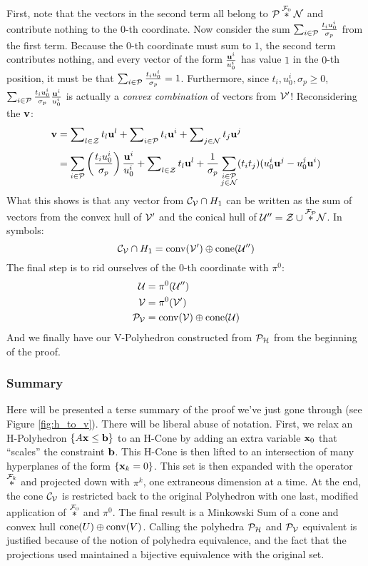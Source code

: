 First, note that the vectors in the second term all belong to $\P \fjoin{0} \N$ and contribute nothing to the $0$-th coordinate.  Now consider the sum $\sum_{i\in\P}\frac{t_i u^i_0}{\sigma_p}$ from the first term.  Because the $0$-th coordinate must sum to $1$, the second term contributes nothing, and every vector of the form $\frac{\u^i}{u^i_0}$ has value $1$ in the $0$-th position, it must be that $\sum_{i\in\P}\frac{t_i u^i_0}{\sigma_p} = 1$.  Furthermore, since $t_i, u^i_0, \sigma_p \geq 0$, $\sum_{i\in\P}\frac{t_i u^i_0}{\sigma_p} \frac{\u^i}{u^i_0}$ is actually a \textit{convex combination} of vectors from $\V'$!  Reconsidering the $\v$:
  \begin{align*}
  \v &= \setsum{t}{l}{\Z} +
        \setsum{t}{i}{\P} +
        \setsum{t}{j}{\N} \\[3pt]
     &= \sum_{i\in\P}\left(\frac{t_i u^i_0}{\sigma_p}\right) \frac{\u^i}{u^i_0} + 
        \setsum{t}{l}{\Z} +
        \frac{1}{\sigma_p}\sum_{\substack{i\in\P\\j\in\N}} (t_i t_j) (u^i_0\u^j - u^j_0\u^i)
  \end{align*}
What this shows is that any vector from $\CV \cap H_1$ can be written as the sum of vectors from the convex hull of $\V'$ and the conical hull of $\U'' = \Z \cup \fjoin{\P}{\N}$.  In symbols:
  \[ \CV \cap H_1 = \conv(\V') \oplus \cone(\U'') \]
The final step is to rid ourselves of the $0$-th coordinate with $\pi^0$:
  \begin{align*}
    \U  &= \pi^0(\U'') \\
    \V  &= \pi^0(\V') \\
    \PV &= \conv(\V) \oplus \cone(\U)
  \end{align*}
And we finally have our V-Polyhedron constructed from $\PH$ from the beginning of the proof.

\subsubsection{Summary}

Here will be presented a terse summary of the proof we've just gone through (see Figure \ref{fig:h_to_v}).  There will be liberal abuse of notation.  First, we relax an H-Polyhedron $\{A\x \leq \b\}$ to an H-Cone by adding an extra variable $\x_0$ that ``scales'' the constraint $\b$.  This H-Cone is then lifted to an intersection of many hyperplanes of the form $\{\x_k = 0\}$.  This set is then expanded with the operator $\fjoink$ and projected down with $\pi^k$, one extraneous dimension at a time.  At the end, the cone $\CV$ is restricted back to the original Polyhedron with one last, modified application of $\fjoin{0}$ and $\pi^0$.  The final result is a Minkowski Sum of a cone and convex hull $\cone(U) \oplus \conv(V)$.  Calling the polyhedra $\PH$ and $\PV$ equivalent is justified because of the notion of polyhedra equivalence, and the fact that the projections used maintained a bijective equivalence with the original set.


